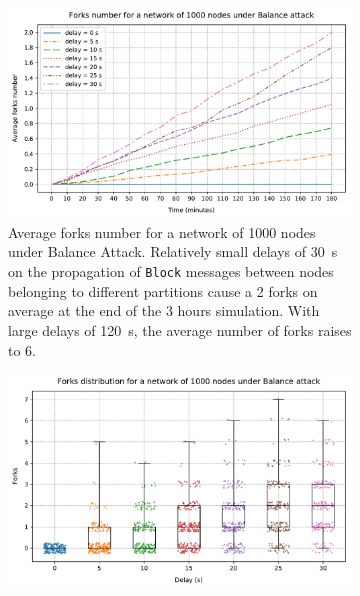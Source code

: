 \begin{figure}[h]
	\begin{subfigure}{\textwidth}
		\centering
		\includegraphics[width=\myplotswitdth \columnwidth]{plots/forks_attack_delay_1000_linechart}
		\vspace*{0.25cm}
		\caption{
			Average forks number for a network of \num{1000} nodes under Balance Attack.
			Relatively small delays of \SI{30}{\second} on the propagation of \texttt{Block} messages between nodes belonging to different partitions cause a \num{2} forks on average at the end of the \num{3} hours simulation.
			With large delays of \SI{120}{\second}, the average number of forks raises to \num{6}.
		}
		\vspace*{0.75cm}
	\end{subfigure}
	\begin{subfigure}{\textwidth}
		\centering
		\vspace*{0.25cm}
		\includegraphics[width=\myplotswitdth \columnwidth]{plots/forks_attack_delay_1000_boxplot}

\end{subfigure}
\end{figure}
